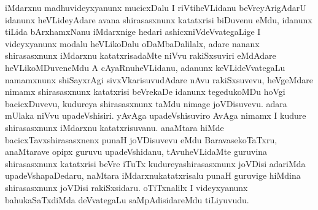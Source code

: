 \begin{artha}
iMdarxnu madhuvideyxyanunx mucicxDalu I riVtiheVLidanu beVreyArigAdarU idanunx heVLideyAdare avana shirasasxnunx katatxrisi biDuvenu eMdu, idanunx tiLida bArxhamxNanu iMdarxnige hedari ashicxniVdeVvategaLige I videyxyanunx modalu heVLikoDalu oDaMbaDalilalx, adare nananx shirasasxnunx iMdarxnu katatxrisadaMte niVvu rakiSxsuviri eMdAdare heVLikoMDuveneMdu A cAyaRnuheVLidanu, adanunx keVLideVvategaLu namamxnunx shiSayxrAgi sivxVkarisuvudAdare nAvu rakiSxsuvevu, heVgeMdare nimamx shirasasxnunx katatxrisi beVrekaDe idanunx tegedukoMDu hoVgi bacicxDuvevu, kudureya shirasasxnunx taMdu nimage joVDisuvevu. adara mUlaka niVvu upadeVshisiri. yAvAga upadeVshisuviro AvAga nimamx I kudure shirasasxnunx iMdarxnu katatxrisuvanu. anaMtara hiMde bacicxTavxshirasasxnenx punaH joVDisuvevu eMdu BaravasekoTaTxru, anaMtarave opipx guruvu upadeVshidanu, tAvuheVLidaMte guruvina shirasasxnunx katatxrisi beVre iTuTx kudureyashirasasxnunx joVDisi adariMda upadeVshapaDedaru, naMtara iMdarxnukatatxrisalu punaH guruvige  hiMdina shirasasxnunx joVDisi rakiSxsidaru. oTiTxnalilx I videyxyanunx bahukaSaTxdiMda deVvategaLu saMpAdisidareMdu tiLiyuvudu.
\end{artha}

